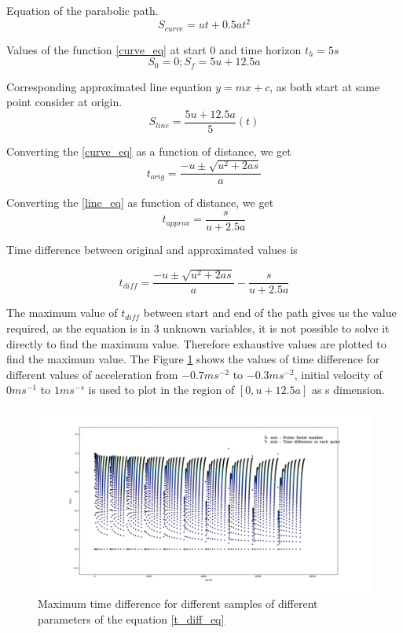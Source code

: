 Equation of the parabolic path. 
\begin{equation}
\label{curve_eq}
S_{curve} = ut + 0.5at^2
\end{equation}

Values of the function \ref{curve_eq} at start $0$ and time horizon $t_h = 5s$ 
\begin{equation}
S_0 = 0; S_f = 5u + 12.5a
\end{equation}

Corresponding approximated line equation $y=mx+c$, as both start at same point consider at origin. 
\begin{equation}
\label{line_eq}
S_{line} = \frac{5u+12.5a}{5}(t)
\end{equation}

Converting the \ref{curve_eq} as a function of distance, we get
\begin{equation}
t_{orig} = \frac{-u \pm \sqrt{u^2 + 2as}}{a}
\end{equation}

Converting the \ref{line_eq} as function of distance, we get
\begin{equation}
\label{line_eq}
t_{approx} = \frac{s}{u+2.5a}
\end{equation}

Time difference between original and approximated values is 

\begin{equation}
\label{t_diff_eq}
t_{diff} = \frac{-u \pm \sqrt{u^2 + 2as}}{a} - \frac{s}{u+2.5a}
\end{equation}

The maximum value of $t_{diff}$ between start and end of the path gives us the value required, as the equation is in 3 unknown variables, it is not possible to solve it directly to find the maximum value. Therefore exhaustive values are plotted to find the maximum value. The Figure \ref{time_diff_plot} shows the values of time difference for different values of acceleration from $-0.7ms^{-2}$ to $-0.3ms^{-2}$, initial velocity of $0ms^{-1}$ to $1ms^{-s}$ is used to plot in the region of $[0,u+12.5a]$ as s dimension. 


\begin{figure}[H]
	\centering
	\includegraphics[width=1.0\textwidth]{Images/appendix/time_diff.png}
	\caption{Maximum time difference for different samples of different parameters of the equation \ref{t_diff_eq}}
	\label{time_diff_plot}
\end{figure}

